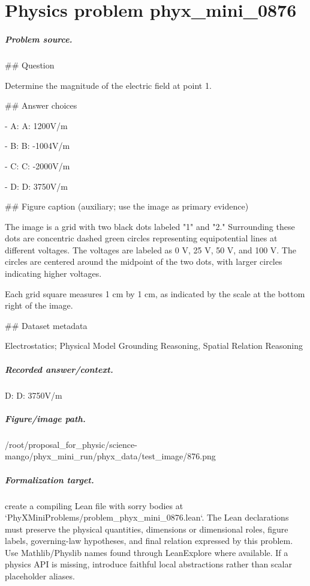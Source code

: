 
\chapter{Physics problem phyx\_mini\_0876}
\label{ch:PhyXMiniProblems_problem_phyx_mini_0876}

\paragraph{Problem source.}
\#\# Question

Determine the magnitude of the electric field at point 1.

\#\# Answer choices

- A: A: 1200V/m

- B: B: -1004V/m

- C: C: -2000V/m

- D: D: 3750V/m

\#\# Figure caption (auxiliary; use the image as primary evidence)

The image is a grid with two black dots labeled "1" and "2." Surrounding these dots are concentric dashed green circles representing equipotential lines at different voltages. The voltages are labeled as 0 V, 25 V, 50 V, and 100 V. The circles are centered around the midpoint of the two dots, with larger circles indicating higher voltages. 

Each grid square measures 1 cm by 1 cm, as indicated by the scale at the bottom right of the image.

\#\# Dataset metadata

Electrostatics; Physical Model Grounding Reasoning, Spatial Relation Reasoning

\paragraph{Recorded answer/context.}
D: D: 3750V/m

\paragraph{Figure/image path.}
/root/proposal\_for\_physic/science-mango/phyx\_mini\_run/phyx\_data/test\_image/876.png

\paragraph{Formalization target.}
create a compiling Lean file with sorry bodies at `PhyXMiniProblems/problem\_phyx\_mini\_0876.lean`. The Lean declarations must preserve the physical quantities, dimensions or dimensional roles, figure labels, governing-law hypotheses, and final relation expressed by this problem.
Use Mathlib/Physlib names found through LeanExplore where available. If a physics API is missing, introduce faithful local abstractions rather than scalar placeholder aliases.

